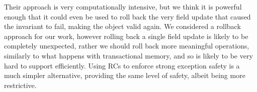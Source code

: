Their approach is very computationally intensive, but we think it is powerful enough that it could even be used to roll back the very field update that caused the invariant to fail, making the object valid again.
We considered a rollback approach for our work, however rolling back a single field update is likely to be completely unexpected, rather we should roll back more meaningful operations, similarly to what happens
with transactional memory, and so is likely to be very hard to support efficiently.
Using RCs to enforce strong exception safety is a much simpler alternative, providing the same level of safety, albeit being more restrictive.



